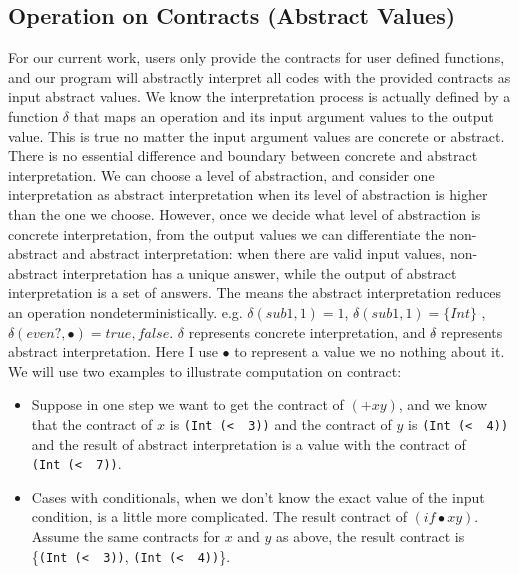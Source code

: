 \documentclass[paper=a4, fontsize=11pt]{scrartcl} %
\numberwithin{equation}{section} %
\numberwithin{figure}{section} %
\numberwithin{table}{section} %
\begin{document}
\subsection{Operation on Contracts (Abstract Values)}
For our current work, users only provide the contracts for user defined functions, and our program will abstractly interpret all codes with the provided contracts as input abstract values.
We know the interpretation process is actually defined by a function $\delta$ that maps an operation and its input argument values to the output value. This is true no matter the input argument values are concrete or abstract. There is no essential difference and boundary between concrete and abstract interpretation. We can choose a level of abstraction, and consider one interpretation as abstract interpretation when its level of abstraction is higher than the one we choose. However, once we decide what level of abstraction is concrete interpretation, from the output values we can differentiate the non-abstract and abstract interpretation: when there are valid input values, non-abstract interpretation has a unique answer, while the output of abstract interpretation is a set of answers. The means the abstract interpretation reduces an operation nondeterministically. e.g. $\delta(sub1, 1) = 1$, $\delta\hat{}(sub1, 1) = \{Int\}$ , $\delta\hat{}(even?, \bullet) = {true, false}$. $\delta$ represents concrete interpretation, and $\delta\hat{}$ represents abstract interpretation. Here I use $\bullet$ to represent a value we no nothing about it.
We will use two examples to illustrate computation on contract:
\begin{itemize}
\item Suppose in one step we want to get the contract of $(+ x y)$, and we know that the contract of $x$ is \texttt{(Int\ (\textless\ \underscore\ 3))} and the contract of $y$ is \texttt{(Int\ (\textless\ \underscore\ 4))} and the result of abstract interpretation is a value with the contract of \texttt{(Int\ (\textless\ \underscore\ 7))}.

\item Cases with conditionals, when we don't know the exact value of the input condition, is a little more complicated. The result contract of $(if \bullet x y)$. Assume the same contracts for $x$ and $y$ as above, the result contract is \{\texttt{(Int\ (\textless\ \underscore\ 3))}, \texttt{(Int\ (\textless\ \underscore\ 4))}\}.

\end{itemize}
 
\end{document}
